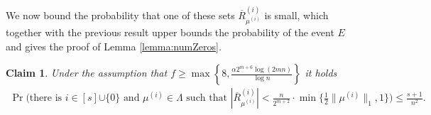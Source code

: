 \documentclass{article}
\newcommand{\normm}[1]{\big\lVert#1\big\rVert}
\newtheorem{claim}[thm]{Claim}
\newcommand{\nrc}{R}
\begin{document}
We now bound the probability that one of these sets $\overline{\nrc}^{(i)}_{\mu^{(i)}}$ is small, which together with the previous result upper bounds the probability of the event $E$ and gives the proof of Lemma  \ref{lemma:numZeros}.

\begin{claim}
Under the assumption that $f \geq \max\left\{8,\frac{\alpha 2^{m+6} \log (2mn)}{\log n}\right\}$
it holds
%
\begin{align*}
    \Pr\bigg(\textrm{there is $i \in [s] {\cup \{0\}}$ and $\mu^{(i)} \in \Lambda$ such that $|\overline{\nrc}^{(i)}_{\mu^{(i)}}| < \frac{n}{2^{m+{2}}} \cdot \min\bigg\{ \frac{1}{{2}} \normm{\mu^{(i)}}_1, 1\bigg\}$}  \bigg) \le \frac{s+1}{n^{2}}.
\end{align*}
\end{claim}
\end{document}
